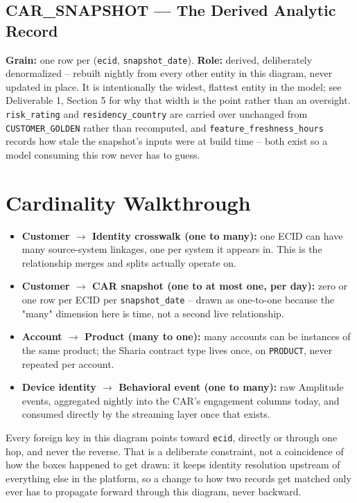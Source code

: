 \documentclass[11pt]{article}
\begin{document}
\subsection{CAR\_SNAPSHOT --- The Derived Analytic Record}
\textbf{Grain:} one row per (\texttt{ecid}, \texttt{snapshot\_date}). \textbf{Role:} derived, deliberately denormalized -- rebuilt nightly from every other entity in this diagram, never updated in place. It is intentionally the widest, flattest entity in the model; see Deliverable 1, Section 5 for why that width is the point rather than an oversight. \texttt{risk\_rating} and \texttt{residency\_country} are carried over unchanged from \texttt{CUSTOMER\_GOLDEN} rather than recomputed, and \texttt{feature\_freshness\_hours} records how stale the snapshot's inputs were at build time -- both exist so a model consuming this row never has to guess.

\section{Cardinality Walkthrough}
\begin{itemize}
\item \textbf{Customer \(\rightarrow\) Identity crosswalk (one to many):} one ECID can have many source-system linkages, one per system it appears in. This is the relationship merges and splits actually operate on.
\item \textbf{Customer \(\rightarrow\) CAR snapshot (one to at most one, per day):} zero or one row per ECID per \texttt{snapshot\_date} -- drawn as one-to-one because the "many" dimension here is time, not a second live relationship.
\item \textbf{Account \(\rightarrow\) Product (many to one):} many accounts can be instances of the same product; the Sharia contract type lives once, on \texttt{PRODUCT}, never repeated per account.
\item \textbf{Device identity \(\rightarrow\) Behavioral event (one to many):} raw Amplitude events, aggregated nightly into the CAR's engagement columns today, and consumed directly by the streaming layer once that exists.
\end{itemize}

\begin{rationale}
Every foreign key in this diagram points toward \texttt{ecid}, directly or through one hop, and never the reverse. That is a deliberate constraint, not a coincidence of how the boxes happened to get drawn: it keeps identity resolution upstream of everything else in the platform, so a change to how two records get matched only ever has to propagate forward through this diagram, never backward.
\end{rationale}
\end{document}
